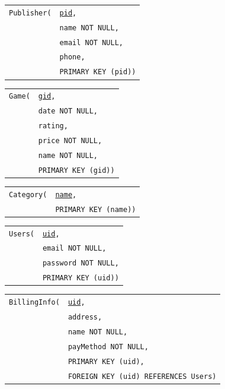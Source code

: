 \documentclass[12pt, oneside]{article}
\begin{document}
\begin{tabular}{l@{}l}
    \texttt{Publisher(} & \texttt{\underline{pid},}\\
                         & \texttt{name NOT NULL,}\\
                         & \texttt{email NOT NULL,}\\
                         & \texttt{phone,}\\
                         & \texttt{PRIMARY KEY (pid))}
\end{tabular}

\begin{tabular}{l@{}l}
    \texttt{Game(} & \texttt{\underline{gid},}\\
                    & \texttt{date NOT NULL,}\\
                    & \texttt{rating,}\\
                    & \texttt{price NOT NULL,}\\
                    & \texttt{name NOT NULL,}\\
                    & \texttt{PRIMARY KEY (gid))}
\end{tabular}

\begin{tabular}{l@{}l}
    \texttt{Category(} & \texttt{\underline{name},}\\
                        & \texttt{PRIMARY KEY (name))}
\end{tabular}

\begin{tabular}{l@{}l}
    \texttt{Users(} & \texttt{\underline{uid},}\\
                     & \texttt{email NOT NULL,}\\
                     & \texttt{password NOT NULL,}\\
                     & \texttt{PRIMARY KEY (uid))}
\end{tabular}

\begin{tabular}{l@{}l}
    \texttt{BillingInfo(} & \texttt{\underline{uid},}\\
                           & \texttt{address,}\\
                           & \texttt{name NOT NULL,}\\
                           & \texttt{payMethod NOT NULL,}\\
                           & \texttt{PRIMARY KEY (uid),}\\
                           & \texttt{FOREIGN KEY (uid) REFERENCES Users)}
\end{tabular}
\end{document}
